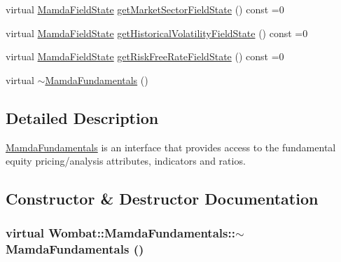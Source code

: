 \begin{CompactItemize}
\item 
virtual \hyperlink{namespaceWombat_93aac974f2ab713554fd12a1fa3b7d2a}{Mamda\-Field\-State} \hyperlink{classWombat_1_1MamdaFundamentals_86af2cf92e30784822ef88cd2d8d8718}{get\-Market\-Sector\-Field\-State} () const =0
\item 
virtual \hyperlink{namespaceWombat_93aac974f2ab713554fd12a1fa3b7d2a}{Mamda\-Field\-State} \hyperlink{classWombat_1_1MamdaFundamentals_239218fdf3b49bf438ae252d6db488fb}{get\-Historical\-Volatility\-Field\-State} () const =0
\item 
virtual \hyperlink{namespaceWombat_93aac974f2ab713554fd12a1fa3b7d2a}{Mamda\-Field\-State} \hyperlink{classWombat_1_1MamdaFundamentals_7551c3b1d9b0eba452270f4cf7627976}{get\-Risk\-Free\-Rate\-Field\-State} () const =0
\item 
virtual \hyperlink{classWombat_1_1MamdaFundamentals_bb35f047ea8a1bde3aac00cd1ea33dc1}{$\sim$Mamda\-Fundamentals} ()
\end{CompactItemize}


\subsection{Detailed Description}
\hyperlink{classWombat_1_1MamdaFundamentals}{Mamda\-Fundamentals} is an interface that provides access to the fundamental equity pricing/analysis attributes, indicators and ratios. 



\subsection{Constructor \& Destructor Documentation}
\hypertarget{classWombat_1_1MamdaFundamentals_bb35f047ea8a1bde3aac00cd1ea33dc1}{
\subsubsection[$\sim$MamdaFundamentals]{\setlength{\rightskip}{0pt plus 5cm}virtual Wombat::Mamda\-Fundamentals::$\sim$Mamda\-Fundamentals ()}}
\label{classWombat_1_1MamdaFundamentals_bb35f047ea8a1bde3aac00cd1ea33dc1}




